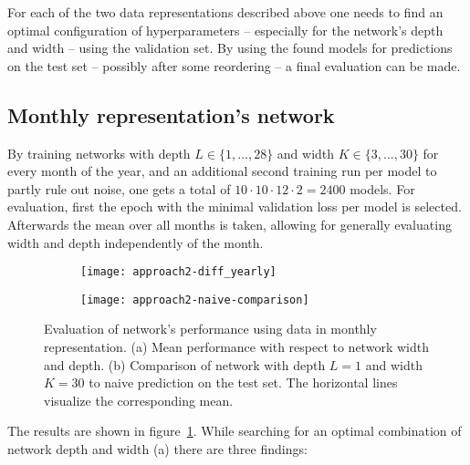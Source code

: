 For each of the two data representations described above one needs to find an optimal configuration of hyperparameters -- especially for the network's depth and width -- using the validation set. By using the found models for predictions on the test set -- possibly after some reordering -- a final evaluation can be made.

\subsection{Monthly representation's network}

By training networks with depth $L \in \{1,\dots,28\}$ and width $K \in \{3,\dots, 30\}$ for every month of the year, and an additional second training run per model to partly rule out noise, one gets a total of $10 \cdot 10 \cdot 12 \cdot 2 = 2400$ models. For evaluation, first the epoch with the minimal validation loss per model is selected. Afterwards the mean over all months is taken, allowing for generally evaluating width and depth independently of the month.

\begin{figure}
	\centering
	\begin{subfigure}{0.49\linewidth}
		\texttt{[image: approach2-diff\_yearly]}
		\caption{}
	\end{subfigure}
	\begin{subfigure}{0.49\linewidth}
		\texttt{[image: approach2-naive-comparison]}
		\caption{}
	\end{subfigure}
	\caption[Evaluation using data in monthly representation]{Evaluation of network's performance using data in monthly representation. (a) Mean performance with respect to network width and depth. (b) Comparison of network with depth $L=1$ and width $K=30$ to naive prediction on the test set. The horizontal lines visualize the corresponding mean.}
	\label{fig:approach2-ex1}
\end{figure}

The results are shown in figure~\ref{fig:approach2-ex1}. While searching for an optimal combination of network depth and width (a) there are three findings:

